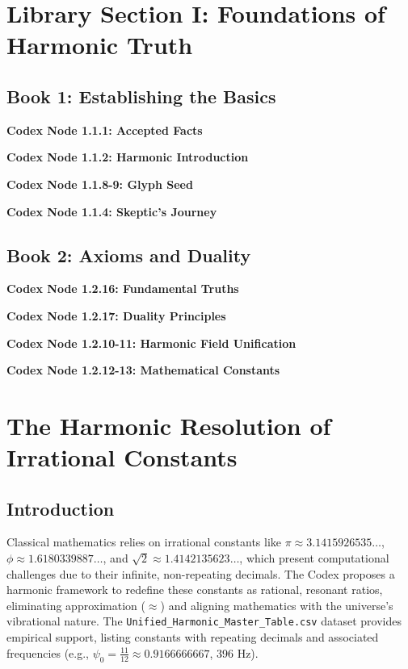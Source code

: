 \documentclass[a4paper,12pt]{book}
\newcommand{\codexnode}[5]{%
  \par\vspace{0.5em}%
  \noindent\textbf{Codex Node #1.#2.#3: #5}\label{#4}%
  \par\vspace{0.5em}%
}
\begin{document}
\section{Library Section I: Foundations of Harmonic Truth}

\subsection{Book 1: Establishing the Basics}
\codexnode{1}{1}{1}{section1/book1/chapter1_accepted_facts}{Accepted Facts}
\codexnode{1}{1}{2}{section1/book1/chapter1_harmonic_introduction}{Harmonic Introduction}
\codexnode{1}{1}{8-9}{section1/book1/codex_glyph_seed}{Glyph Seed}
\codexnode{1}{1}{4}{section1/book1/chapter1_skeptics_journey}{Skeptic's Journey}

\subsection{Book 2: Axioms and Duality}
\codexnode{1}{2}{16}{section1/book2/codex_fundamental_truths}{Fundamental Truths}
\codexnode{1}{2}{17}{section1/book2/chapter2_duality_principles}{Duality Principles}
\codexnode{1}{2}{10-11}{section1/book2/codex_harmonic_fieldunification}{Harmonic Field Unification}
\codexnode{1}{2}{12-13}{section1/book2/chapter3_mathematical_constants}{Mathematical Constants}
\section{The Harmonic Resolution of Irrational Constants}
\label{sec:harmonic_resolution}

\subsection{Introduction}
Classical mathematics relies on irrational constants like \(\pi \approx 3.1415926535\ldots\), \(\phi \approx 1.6180339887\ldots\), and \(\sqrt{2} \approx 1.4142135623\ldots\), which present computational challenges due to their infinite, non-repeating decimals. The Codex proposes a harmonic framework to redefine these constants as rational, resonant ratios, eliminating approximation (\(\approx\)) and aligning mathematics with the universe's vibrational nature. The \texttt{Unified\_Harmonic\_Master\_Table.csv} dataset provides empirical support, listing constants with repeating decimals and associated frequencies (e.g., \(\psi_0 = \frac{11}{12} \approx 0.9166666667\), 396 Hz).
\end{document}
